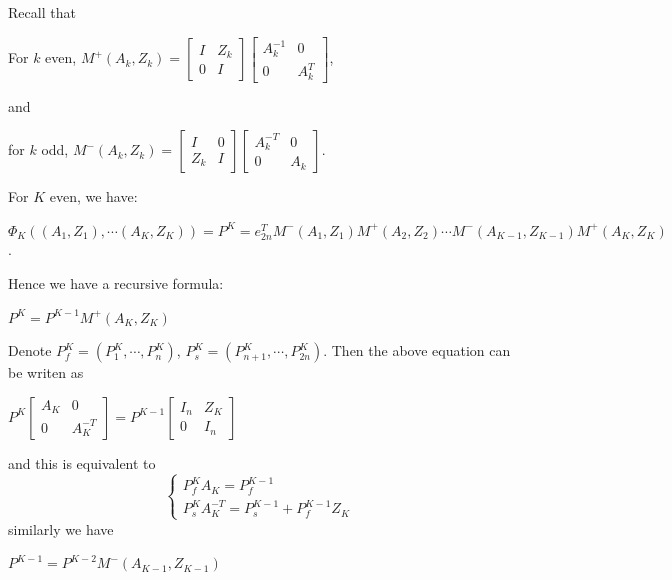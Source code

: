 \documentclass[10pt]{amsart}
\theoremstyle{remark}
\begin{document}
Recall that
\begin{center}
       For $k$ even, $M^+(A_k,Z_k) =\left[\begin{array}{ccc} I & Z_k \\ 0 & I\end{array}\right] \left[\begin{array}{ccc} A^{-1}_k & 0 \\ 0 & A^T_k\end{array}\right]  $, 
    \end{center}
    and
    \begin{center}
    for $k$ odd, $M^-(A_k,Z_k)=\left[\begin{array}{ccc} I & 0 \\ Z_k & I \end{array}\right] \left[\begin{array}{ccc} A_k^{-T} & 0 \\ 0 & A_k \end{array}\right] $.
\end{center}
 For $K$ even, we have:
 \begin{center}
     $\Phi_K((A_1,Z_1),\cdots (A_K,Z_K)) = P^K =  e^T_{2n} M^-(A_1,Z_1) M^+(A_2,Z_2) \cdots M^-(A_{K-1},Z_{K-1}) M^+(A_K,Z_K)$.
 \end{center}
 Hence we have a recursive formula:
 \begin{center}
     $P^K = P^{K-1} M^+(A_K,Z_K)$
 \end{center}
Denote $P^K_f=(P^K_1,\cdots,P^K_n)$, $P^K_s=(P^K_{n+1},\cdots,P^K_{2n})$. Then the above equation can be writen as
\begin{center}
    $P^K \left[\begin{array}{ccc} A_K & 0 \\ 0 & A^{-T}_K\end{array}\right] = P^{K-1} \left[\begin{array}{ccc} I_n & Z_K \\ 0 & I_n\end{array}\right]$
\end{center}
and this is equivalent to
\begin{equation}\label{equa-2}
    \begin{cases}
    P^K_f A_K = P^{K-1}_{f} \\
      P^K_s A^{-T}_K = P^{K-1}_s + P^{K-1}_f Z_K 
\end{cases}
\end{equation}
similarly we have
\begin{center}
     $P^{K-1} = P^{K-2} M^-(A_{K-1},Z_{K-1})$
\end{center}
\end{document}
